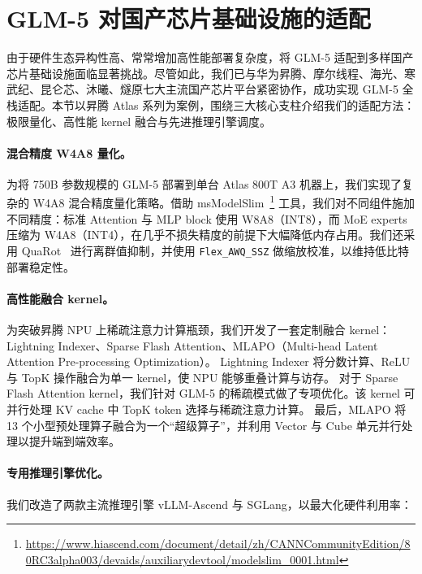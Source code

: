 \section{GLM-5 对国产芯片基础设施的适配}
\label{sec:chinese}

由于硬件生态异构性高、常常增加高性能部署复杂度，将 GLM-5 适配到多样国产芯片基础设施面临显著挑战。尽管如此，我们已与华为昇腾、摩尔线程、海光、寒武纪、昆仑芯、沐曦、燧原七大主流国产芯片平台紧密协作，成功实现 GLM-5 全栈适配。本节以昇腾 Atlas 系列为案例，围绕三大核心支柱介绍我们的适配方法：极限量化、高性能 kernel 融合与先进推理引擎调度。

\paragraph{混合精度 W4A8 量化。}
为将 750B 参数规模的 GLM-5 部署到单台 Atlas 800T A3 机器上，我们实现了复杂的 W4A8 混合精度量化策略。借助 msModelSlim~\footnote{\url{https://www.hiascend.com/document/detail/zh/CANNCommunityEdition/80RC3alpha003/devaids/auxiliarydevtool/modelslim_0001.html}} 工具，我们对不同组件施加不同精度：标准 Attention 与 MLP block 使用 W8A8（INT8），而 MoE experts 压缩为 W4A8（INT4），在几乎不损失精度的前提下大幅降低内存占用。我们还采用 QuaRot~\cite{ashkboos2024quarotoutlierfree4bitinference} 进行离群值抑制，并使用 \texttt{Flex\_AWQ\_SSZ} 做缩放校准，以维持低比特部署稳定性。

\paragraph{高性能融合 kernel。}
为突破昇腾 NPU 上稀疏注意力计算瓶颈，我们开发了一套定制融合 kernel：Lightning Indexer、Sparse Flash Attention、MLAPO（Multi-head Latent Attention Pre-processing Optimization）。
Lightning Indexer 将分数计算、ReLU 与 TopK 操作融合为单一 kernel，使 NPU 能够重叠计算与访存。
对于 Sparse Flash Attention kernel，我们针对 GLM-5 的稀疏模式做了专项优化。该 kernel 可并行处理 KV cache 中 TopK token 选择与稀疏注意力计算。
最后，MLAPO 将 13 个小型预处理算子融合为一个“超级算子”，并利用 Vector 与 Cube 单元并行处理以提升端到端效率。

\paragraph{专用推理引擎优化。}
我们改造了两款主流推理引擎 vLLM-Ascend 与 SGLang，以最大化硬件利用率：


